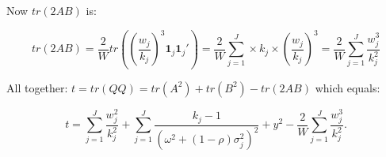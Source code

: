 Now $tr(2AB)$ is:

\begin{equation}
    tr(2AB) = \frac{2}{W}tr\left(\left(\frac{w_j}{k_j}\right)^3\mathbf{1}_j\mathbf{1}_j'\right) = \frac{2}{W} \sum_{j=1}^J\times k_j \times \left(\frac{w_j}{k_j}\right)^3 = \frac{2}{W}\sum_{j=1}^J\frac{w_j^3}{k_j^2}
    \nonumber
\end{equation}

All together: $t = tr(QQ) = tr(A^2) + tr(B^2) - tr(2AB)$ which equals:

\begin{equation}
    t = \sum_{j=1}^J \frac{w_j^2}{k_j^2} + \sum_{j=1}^J \frac{k_j-1}{(\omega^2 + (1-\rho)\sigma_j^2)^2} + y^2 - \frac{2}{W}\sum_{j=1}^J\frac{w_j^3}{k_j^2}.
    \nonumber
\end{equation}


